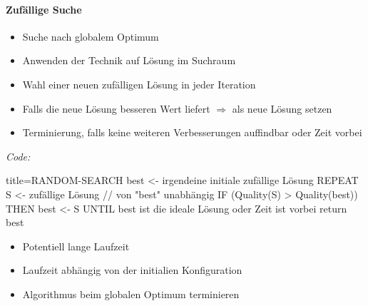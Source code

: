 \documentclass[
    ngerman,
    color=3b,
    load_common, %
    summary,
    boxarc,
]{rubos-tuda-template}
\begin{document}
\paragraph{Zufällige Suche}\mbox{}
\begin{idea}\mbox{}
    \begin{itemize}
        \item Suche nach globalem Optimum
        \item Anwenden der Technik auf  Lösung im Suchraum
        \item Wahl einer neuen zufälligen Lösung in jeder Iteration
        \item Falls die neue Lösung besseren Wert liefert $\Rightarrow$ als neue  Lösung setzen
        \item Terminierung, falls keine weiteren Verbesserungen auffindbar oder Zeit vorbei
    \end{itemize}
\end{idea}
\textit{Code:}

\begin{codeBlock}[autogobble]{title={RANDOM-SEARCH}}
best <- irgendeine initiale zufällige Lösung
REPEAT
    S <- zufällige Lösung // von "best" unabhängig
    IF (Quality(S) > Quality(best)) THEN
        best <- S
UNTIL best ist die ideale Lösung oder Zeit ist vorbei
return best
\end{codeBlock}
\begin{description}[leftmargin=2cm,itemsep=.8em]
    \item[Nachteile] \begin{itemize}
              \item Potentiell lange Laufzeit
              \item Laufzeit abhängig von der initialien Konfiguration
          \end{itemize}
    \item[Vorteile] \begin{itemize}
              \item Algorithmus  beim globalen Optimum terminieren
          \end{itemize}
\end{description}

\clearpage
\end{document}
